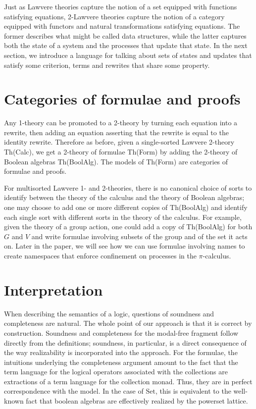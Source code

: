 \documentclass{llncs}
\renewcommand{\:}{\colon}
\newcommand{\Set}{\mathrm{Set}}
\begin{document}
Just as Lawvere theories capture the notion of a set equipped with functions satisfying equations, 2-Lawvere theories capture the notion of a category equipped with functors and natural transformations satisfying equations.  The former describes what might be called data structures, while the latter captures both the state of a system and the processes that update that state.  In the next section, we introduce a language for talking about sets of states and updates that satisfy some criterion, terms and rewrites that share some property.

\section{Categories of formulae and proofs}

Any 1-theory can be promoted to a 2-theory by turning each equation into a rewrite, then adding an equation asserting that the rewrite is equal to the identity rewrite.  Therefore as before, given a single-sorted Lawvere 2-theory Th(Calc), we get a 2-theory of formulae Th(Form) by adding the 2-theory of Boolean algebras Th(BoolAlg).  The models of Th(Form) are categories of formulae and proofs.

For multisorted Lawvere 1- and 2-theories, there is no canonical choice of sorts to identify between the theory of the calculus and the theory of Boolean algebras; one may choose to add one or more different copies of Th(BoolAlg) and identify each single sort with different sorts in the theory of the calculus.  For example, given the theory of a group action, one could add a copy of Th(BoolAlg) for both $G$ and $V$ and write formulae involving subsets of the group and of the set it acts on.  Later in the paper, we will see how we can use formulae involving names to create namespaces that enforce confinement on processes in the $\pi$-calculus.

\section{Interpretation}

When describing the semantics of a logic, questions of soundness and
completeness are natural.  The whole point of our approach is that it
is correct by construction.  Soundness and completeness for the
modal-free fragment follow directly from the definitions; soundness,
in particular, is a direct consequence of the way realizability is
incorporated into the approach.  For the formulae, the intuitions
underlying the completeness argument amount to the fact that the term
language for the logical operators associated with the collections are
extractions of a term language for the collection monad.  Thus, they
are in perfect correspondence with the model.  In the case of $\Set$,
this is equivalent to the well-known fact that boolean algebras are
effectively realized by the powerset lattice.
\end{document}
